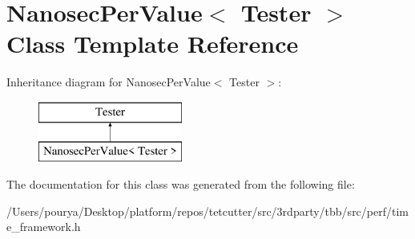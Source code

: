 \hypertarget{classNanosecPerValue}{}\section{Nanosec\+Per\+Value$<$ Tester $>$ Class Template Reference}
\label{classNanosecPerValue}
Inheritance diagram for Nanosec\+Per\+Value$<$ Tester $>$\+:\begin{figure}[H]
\begin{center}
\leavevmode
\includegraphics[height=2.000000cm]{classNanosecPerValue}
\end{center}
\end{figure}


The documentation for this class was generated from the following file\+:\begin{DoxyCompactItemize}
\item 
/\+Users/pourya/\+Desktop/platform/repos/tetcutter/src/3rdparty/tbb/src/perf/time\+\_\+framework.\+h\end{DoxyCompactItemize}
